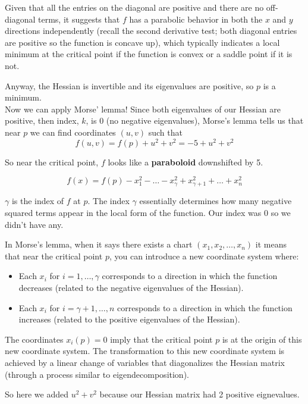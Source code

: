 Given that all the entries on the diagonal are positive and there are no off-diagonal terms, it suggests that 
$f$ has a parabolic behavior in both the $x$ and $y$ directions independently
(recall the second derivative test; both diagonal entries are positive so the function is concave up),
which typically indicates a local minimum at the critical point if the function is convex or a saddle point if it is not. 

Anyway, the Hessian is invertible and its eigenvalues are positive, so $p$ is a minimum.
\\

Now we can apply Morse' lemma!
Since both eigenvalues of our Hessian are positive, then index, $k$, is 0 (no negative eigenvalues),
Morse's lemma tells us that near $p$ we can find coordinates $(u, v)$ such that
$$
f(u, v) = f(p) + u^2 + v^2 = -5 + u^2 +v^2
$$

So near the critical point, $f$ looks like a \textbf{paraboloid} downshifted by 5.

$$
f(x) = f(p) - x_{1}^{2} - \ldots - x_{\gamma}^{2} + x_{\gamma +1}^{2} + \ldots + x_{n}^{2}
$$

$\gamma$ is the index of $f$ at $p$.
The index $\gamma$ essentially determines how many negative squared terms appear in the local form of the function.
Our index was 0 so we didn't have any.

In Morse's lemma, when it says there exists a chart $(x_1, x_2, \ldots , x_n)$
it means that near the critical point $p$, you can introduce a new coordinate system where:

\begin{itemize}
    \item Each $x_i$ for $i = 1, \ldots , \gamma$ corresponds to a direction in which the function decreases
        (related to the negative eigenvalues of the Hessian).
    \item Each $x_i$ for $i = \gamma +1, \ldots, n$ corresponds to a direction in which the function increases
        (related to the positive eigenvalues of the Hessian).
\end{itemize}

The coordinates $x_i (p) = 0$ imply that the critical point $p$ is at the origin of this new coordinate system.
The transformation to this new coordinate system is achieved by a linear change of variables that diagonalizes
the Hessian matrix (through a process similar to eigendecomposition).

So here we added $u^2 + v^2$ because our Hessian matrix had 2 positive eignevalues.
\\~\\



